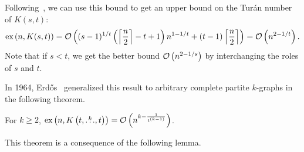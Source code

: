 \begin{remark}
    Following~, we can use this bound to get an upper bound on the Turán number of $K(s, t)$:
    \[
        \text{ex} \left( n, K(s, t) \right) =
        \mathcal{O}\left((s - 1)^{1 / t}\left(\left\lceil\frac{n}{2}\right\rceil - t + 1\right)n^{1 - 1 / t} + (t - 1)\left\lceil\frac{n}{2}\right\rceil\right) =
        \mathcal{O}\left(n^{2 - 1 / t}\right).
    \]
    Note that if $s < t$, we get the better bound $\mathcal{O}\left(n^{2 - 1 / s}\right)$ by interchanging the roles of $s$ and $t$.
\end{remark}

In 1964, Erdős~\cite{Erods1964} generalized this result to arbitrary complete partite $k$-graphs in the following theorem.

\begin{theorem}\label{thm:erdos64}
    For $k \geq 2$,
    $\text{ex} \left( n, K\left(t, \overset{k}{\dots}, t\right) \right) = \mathcal{O}\left(n^{k - \frac{1}{t^{(k-1)}}}\right)$.
\end{theorem}

This theorem is a consequence of the following lemma.

